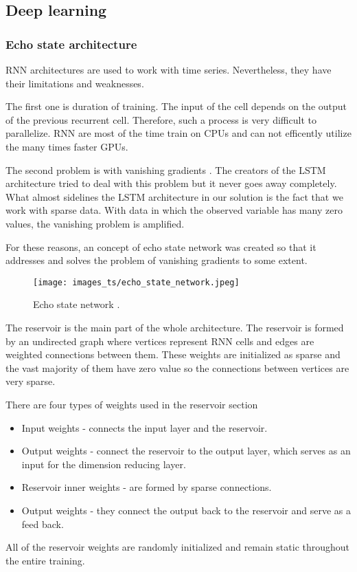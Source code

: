\documentclass[thesis=M,english]{FITthesis}[2019/12/23]
\begin{document}
\clearpage
\subsection{Deep learning}
\subsubsection{Echo state architecture}
RNN architectures are used to work with time series. Nevertheless, they have their limitations and weaknesses.

The first one is duration of training. The input of the cell depends on the output of the previous recurrent cell. Therefore, such a process is very difficult to parallelize. RNN are most of the time train on CPUs and can not efficently utilize the many times faster GPUs.

The second problem is with vanishing gradients \cite{echo_state_network_paper}. The creators of the LSTM architecture tried to deal with this problem but it never goes away completely. What almost sidelines the LSTM architecture in our solution is the fact that we work with sparse data. With data in which the observed variable has many zero values, the vanishing problem is amplified.

For these reasons, an concept of echo state network was created so that it addresses and solves the problem of vanishing gradients to some extent.

\begin{figure}[ht!]
    \texttt{[image: images\_ts/echo\_state\_network.jpeg]}
    \caption{Echo state network \cite{time_series_classification}. } 
    \label{fig:echo_state_network}
    \centering
\end{figure}

The reservoir is the main part of the whole \cite{echo_state_network_reservoir} architecture. The reservoir is formed by an undirected graph where vertices represent RNN cells and edges are weighted connections between them. These weights are initialized as sparse and the vast majority of them have zero value so the connections between vertices are very sparse.

\noindent There are four types of weights used in the reservoir section
\begin{itemize}
		\item Input weights - connects the input layer and the reservoir.
		\item Output weights - connect the reservoir to the output layer, which serves as an input for the dimension reducing layer.
		\item Reservoir inner weights - are formed by sparse connections.
		\item Output weights -  they connect the output back to the reservoir and serve as a feed back.
	\end{itemize}
All of the reservoir weights are randomly initialized and remain static throughout the entire training.
\end{document}
